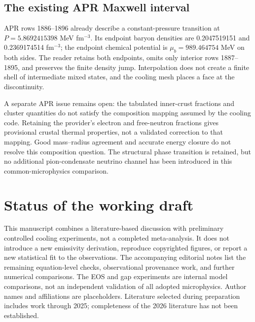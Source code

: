 \documentclass{aa}
\begin{document}
\begin{appendix}
\subsection{The existing APR Maxwell interval}
APR rows 1886--1896 already describe a constant-pressure transition at $P=5.8692415398$ MeV fm$^{-3}$. Its endpoint baryon densities are 0.2047519151 and 0.2369174514 fm$^{-3}$; the endpoint chemical potential is $\mu_b=989.464754$ MeV on both sides. The reader retains both endpoints, omits only interior rows 1887--1895, and preserves the finite density jump. Interpolation does not create a finite shell of intermediate mixed states, and the cooling mesh places a face at the discontinuity.

A separate APR issue remains open: the tabulated inner-crust fractions and cluster quantities do not satisfy the composition mapping assumed by the cooling code. Retaining the provider's electron and free-neutron fractions gives provisional crustal thermal properties, not a validated correction to that mapping. Good mass--radius agreement and accurate energy closure do not resolve this composition question. The structural phase transition is retained, but no additional pion-condensate neutrino channel has been introduced in this common-microphysics comparison.

\section{Status of the working draft}
This manuscript combines a literature-based discussion with preliminary controlled cooling experiments, not a completed meta-analysis. It does not introduce a new emissivity derivation, reproduce copyrighted figures, or report a new statistical fit to the observations. The accompanying editorial notes list the remaining equation-level checks, observational provenance work, and further numerical comparisons. The EOS and gap experiments are internal model comparisons, not an independent validation of all adopted microphysics. Author names and affiliations are placeholders. Literature selected during preparation includes work through 2025; completeness of the 2026 literature has not been established.
\end{appendix}
\end{document}
